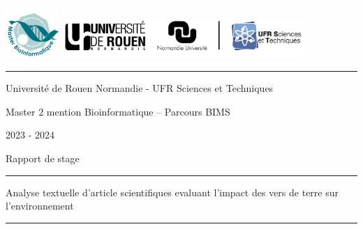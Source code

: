 \documentclass{book}
\begin{document}

\newpage
\thispagestyle{empty}
\vspace{-5cm}
\includegraphics[height=2cm]{univ.png}
\hfill
\includegraphics[height=1.5cm]{URN_NU_ST.jpg}

\vspace{0.5cm}
\hrule
\vspace{0.5cm}

\begin{center}
    \large{Université de Rouen Normandie - UFR Sciences et Techniques}
\end{center}

\begin{center}
    \large{Master 2 mention Bioinformatique – Parcours BIMS}
\end{center}

\begin{center}
    \large{2023 - 2024}
\end{center}

\vspace{1cm}

\begin{center}
    \Large{Rapport de stage}
\end{center}

\begin{center}
    \vspace{1cm}
    \hrule
    \vspace{1cm}
    \huge{Analyse textuelle d'article scientifiques evaluant l’impact des vers
        de terre sur l’environnement }
    \vspace{1cm}
    \hrule
    \vspace{1cm}
\end{center}
\end{document}
